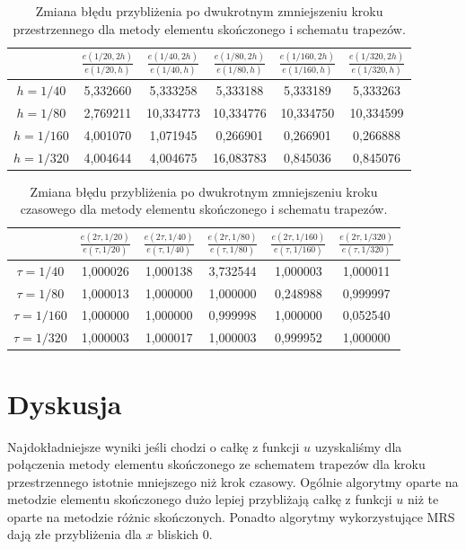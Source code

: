 \documentclass{article}
\begin{document}
\begin{table}[h!]
	\caption{Zmiana błędu przybliżenia po dwukrotnym zmniejszeniu kroku przestrzennego dla metody elementu skończonego i schematu trapezów.}
	\centering
	\begin{tabular}{|c|c|c|c|c|c|}
		\hline
		& $\frac{e(1/20,2h)}{e(1/20,h)}$ &  $\frac{e(1/40,2h)}{e(1/40,h)}$ &  $\frac{e(1/80,2h)}{e(1/80,h)}$ &  $\frac{e(1/160,2h)}{e(1/160,h)}$ &  $\frac{e(1/320,2h)}{e(1/320,h)}$ \\
		\hline
		$h=1/40$  &  5,332660 &	5,333258 &	5,333188 &	5,333189 &	5,333263 \\
		\hline
		$h=1/80$  &2,769211 &	10,334773 &	10,334776 &	10,334750 &	10,334599 \\
		\hline
		$h=1/160$ & 4,001070 &	1,071945 &	0,266901 &	0,266901 &	0,266888 \\
		\hline
		$h=1/320$ & 4,004644 &	4,004675 &	16,083783 &	0,845036 &	0,845076 \\
		\hline
	\end{tabular}
\end{table}
\begin{table}[h!]
	\caption{Zmiana błędu przybliżenia po dwukrotnym zmniejszeniu kroku czasowego dla metody elementu skończonego i schematu trapezów.}
	\centering
	\begin{tabular}{|c|c|c|c|c|c|}
		\hline
		& $\frac{e(2\tau,1/20)}{e(\tau,1/20)}$ &  $\frac{e(2\tau,1/40)}{e(\tau,1/40)}$ &  $\frac{e(2\tau,1/80)}{e(\tau,1/80)}$ &  $\frac{e(2\tau,1/160)}{e(\tau,1/160)}$ &  $\frac{e(2\tau,1/320)}{e(\tau,1/320)}$ \\
		\hline
		$\tau=1/40$ & 1,000026 &	1,000138 &	3,732544 &	1,000003 &	1,000011 \\
		\hline
		$\tau=1/80$  & 1,000013 &	1,000000 &	1,000000 &	0,248988 &	0,999997 \\
		\hline
		$\tau=1/160$ & 1,000000 &	1,000000 &	0,999998 &	1,000000 &	0,052540 \\
		\hline
		$\tau=1/320$ & 1,000003 &	1,000017 &	1,000003 &	0,999952 &	1,000000 \\
		\hline
	\end{tabular}
\end{table}

\newpage
\section{Dyskusja}
Najdokładniejsze wyniki jeśli chodzi o całkę z funkcji $u$ uzyskaliśmy dla połączenia metody elementu skończonego ze schematem trapezów dla kroku przestrzennego istotnie mniejszego niż krok czasowy. Ogólnie algorytmy oparte na metodzie elementu skończonego dużo lepiej przybliżają całkę z funkcji $u$ niż te oparte na metodzie różnic skończonych. Ponadto algorytmy wykorzystujące MRS dają złe przybliżenia dla $x$ bliskich 0.
\end{document}
